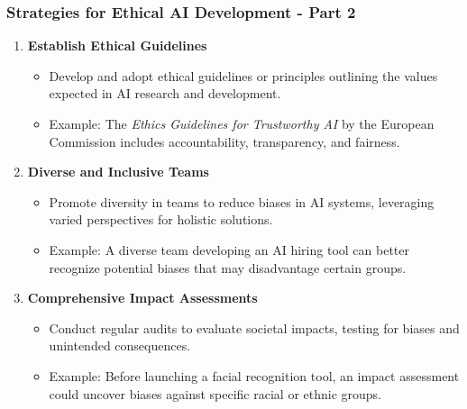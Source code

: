 \documentclass[aspectratio=169]{beamer}
\begin{document}
\begin{frame}[fragile]
    \frametitle{Strategies for Ethical AI Development - Part 2}
    \begin{enumerate}
        \item \textbf{Establish Ethical Guidelines}
            \begin{itemize}
                \item Develop and adopt ethical guidelines or principles outlining the values expected in AI research and development.
                \item Example: The \textit{Ethics Guidelines for Trustworthy AI} by the European Commission includes accountability, transparency, and fairness.
            \end{itemize}
            
        \item \textbf{Diverse and Inclusive Teams}
            \begin{itemize}
                \item Promote diversity in teams to reduce biases in AI systems, leveraging varied perspectives for holistic solutions.
                \item Example: A diverse team developing an AI hiring tool can better recognize potential biases that may disadvantage certain groups.
            \end{itemize}
        
        \item \textbf{Comprehensive Impact Assessments}
            \begin{itemize}
                \item Conduct regular audits to evaluate societal impacts, testing for biases and unintended consequences.
                \item Example: Before launching a facial recognition tool, an impact assessment could uncover biases against specific racial or ethnic groups.
            \end{itemize}
    \end{enumerate}
\end{frame}
\end{document}

